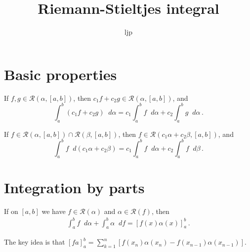 \documentclass{article}
\title{Riemann-Stieltjes integral}
\author{ljp}
\newcommand{\Riemann}{\mathcal R}
\newcommand{\dd}{\mathop{}\!d}
\begin{document}
\maketitle
\tableofcontents

\newpage
\section{Basic properties}

\begin{theorem}
    If $ f, g \in \Riemann(\alpha, [a, b]) $, then $ c_1 f + c_2 g \in \Riemann(\alpha, [a, b]) $, and 
    \[ 
        \int_a^b (c_1 f + c_2 g) \dd \alpha = c_1 \int_a^b f \dd \alpha + c_2 \int_a^b g \dd \alpha \,.    
    \]
\end{theorem}

\begin{theorem}
    If $ f \in \Riemann(\alpha, [a, b]) \cap \Riemann(\beta, [a, b]) $, then $ f \in \Riemann(c_1 \alpha + c_2 \beta, [a, b]) $, and
    \[ 
        \int_a^b f \dd (c_1 \alpha + c_2 \beta) = c_1 \int_a^b f \dd \alpha + c_2 \int_a^b f \dd \beta \,.
    \]
\end{theorem}


\section{Integration by parts}
\begin{theorem} \label{thm:int-by-part}
    If on $ [a, b] $ we have $ f \in \Riemann (\alpha) $ and $ \alpha \in \Riemann(f) $, then
    \begin{align} \label{eq:int-by-part}
        \int_a^b f \dd \alpha + \int_a^b \alpha \dd f = [f(x) \alpha(x)]_a^b \,.
    \end{align}
\end{theorem}

The key idea is that $ [f a]_a^b = \sum_{k=1}^{n} [f(x_n) \alpha(x_n) - f(x_{n-1}) \alpha(x_{n-1})] $.
\end{document}
